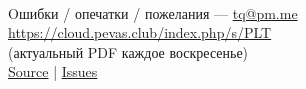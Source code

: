 \tableofcontents
{}
\vfill ~
\begin{center}
Oшибки / опечатки / пожелания --- \href{mailto:tq@pm.me}{tq@pm.me} \\
\url{https://cloud.pevas.club/index.php/s/PLT} \\ 
(актуальный PDF каждое воскресенье) \\
\href{https://gitlab.com/tiulpin/plt}{Source} | \href{https://gitlab.com/tiulpin/plt/issues}{Issues}\\
\end{center}
